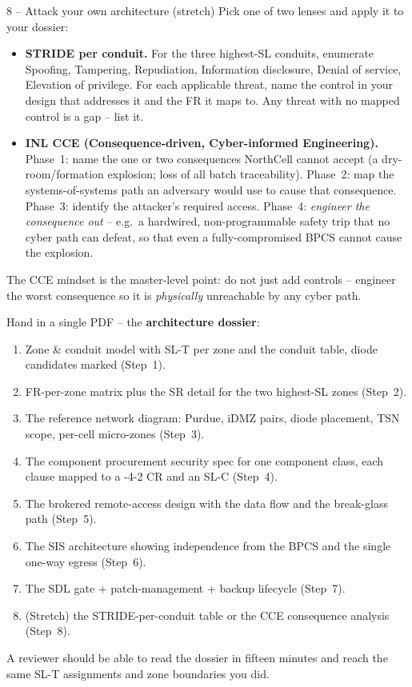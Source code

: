 \documentclass[11pt,a4paper]{article}
\begin{document}
\begin{stepbox}{8 -- Attack your own architecture (stretch)}
Pick one of two lenses and apply it to your dossier:
\begin{itemize}\setlength{\itemsep}{1pt}
  \item \textbf{STRIDE per conduit.} For the three highest-SL conduits,
    enumerate Spoofing, Tampering, Repudiation, Information disclosure,
    Denial of service, Elevation of privilege. For each applicable
    threat, name the control in your design that addresses it and the FR
    it maps to. Any threat with no mapped control is a gap -- list it.
  \item \textbf{INL CCE (Consequence-driven, Cyber-informed Engineering).}
    Phase~1: name the one or two consequences NorthCell cannot accept
    (a dry-room/formation explosion; loss of all batch traceability).
    Phase~2: map the systems-of-systems path an adversary would use to
    cause that consequence. Phase~3: identify the attacker's required
    access. Phase~4: \emph{engineer the consequence out} -- e.g.\ a
    hardwired, non-programmable safety trip that no cyber path can defeat,
    so that even a fully-compromised BPCS cannot cause the explosion.
\end{itemize}
The CCE mindset is the master-level point: do not just add controls --
engineer the worst consequence so it is \emph{physically} unreachable
by any cyber path.
\end{stepbox}

\begin{deliverbox}
Hand in a single PDF -- the \textbf{architecture dossier}:
\begin{enumerate}\setlength{\itemsep}{1pt}
  \item Zone \& conduit model with SL-T per zone and the conduit table,
    diode candidates marked (Step~1).
  \item FR-per-zone matrix plus the SR detail for the two highest-SL
    zones (Step~2).
  \item The reference network diagram: Purdue, iDMZ pairs, diode
    placement, TSN scope, per-cell micro-zones (Step~3).
  \item The component procurement security spec for one component class,
    each clause mapped to a -4-2 CR and an SL-C (Step~4).
  \item The brokered remote-access design with the data flow and the
    break-glass path (Step~5).
  \item The SIS architecture showing independence from the BPCS and the
    single one-way egress (Step~6).
  \item The SDL gate + patch-management + backup lifecycle (Step~7).
  \item (Stretch) the STRIDE-per-conduit table or the CCE consequence
    analysis (Step~8).
\end{enumerate}
A reviewer should be able to read the dossier in fifteen minutes and
reach the same SL-T assignments and zone boundaries you did.
\end{deliverbox}
\end{document}
